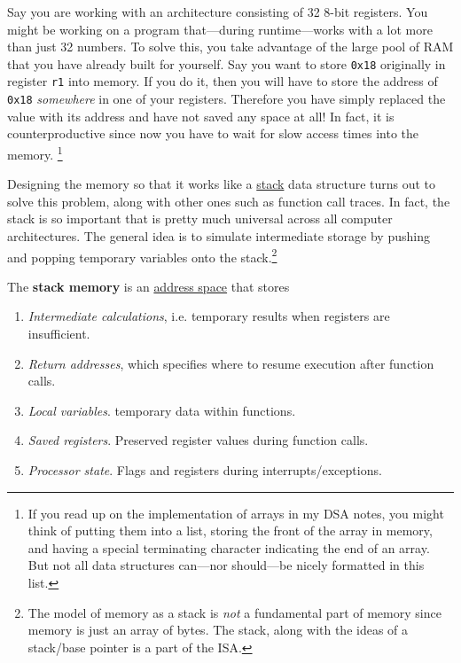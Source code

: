   Say you are working with an architecture consisting of 32 8-bit registers. You might be working on a program that---during runtime---works with a lot more than just 32 numbers. To solve this, you take advantage of the large pool of RAM that you have already built for yourself. Say you want to store \texttt{0x18} originally in register \texttt{r1} into memory. If you do it, then you will have to store the address of \texttt{0x18} \textit{somewhere} in one of your registers. Therefore you have simply replaced the value with its address and have not saved any space at all! In fact, it is counterproductive since now you have to wait for slow access times into the memory. \footnote{If you read up on the implementation of arrays in my DSA notes, you might think of putting them into a list, storing the front of the array in memory, and having a special terminating character indicating the end of an array. But not all data structures can---nor should---be nicely formatted in this list.}

  Designing the memory so that it works like a \hyperref[dsa-def:stack]{stack} data structure turns out to solve this problem, along with other ones such as function call traces. In fact, the stack is so important that is pretty much universal across all computer architectures. The general idea is to simulate intermediate storage by pushing and popping temporary variables onto the stack.\footnote{The model of memory as a stack is \textit{not} a fundamental part of memory since memory is just an array of bytes. The stack, along with the ideas of a stack/base pointer is a part of the ISA.}

  \begin{definition}
    \label{def:stack-memory-segment}
    The \textbf{stack memory} is an \hyperref[def:address-space]{address space} that stores 
    \begin{enumerate}
      \item \textit{Intermediate calculations}, i.e. temporary results when registers are insufficient. 
      \item \textit{Return addresses}, which specifies where to resume execution after function calls. 
      \item \textit{Local variables}. temporary data within functions. 
      \item \textit{Saved registers}. Preserved register values during function calls. 
      \item \textit{Processor state}. Flags and registers during interrupts/exceptions. 
    \end{enumerate}
  \end{definition}

